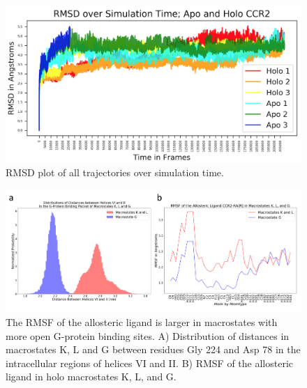 \begin{figure}[htbp]
\centering
\includegraphics[width=\textwidth]{./figures/rmsd.png}
\caption[RMSD of CCR2 trajectories over time]{RMSD plot of all trajectories over simulation time.}
\label{fig:rmsd}
\end{figure}

\begin{figure}[htbp]
  \centering
  \includegraphics[width=\textwidth]{./figures/alloligand.png}
 \caption[Analysis of CCR2 allosteric ligand dynamics]{The RMSF of the allosteric ligand is larger in macrostates with more open G-protein binding sites. A) Distribution of distances in macrostates K, L and G between residues Gly 224 and Asp 78 in the intracellular regions of helices VI and II. B) RMSF of the allosteric ligand in holo macrostates K, L, and G.}
  \label{fig:alloligand}
\end{figure}

